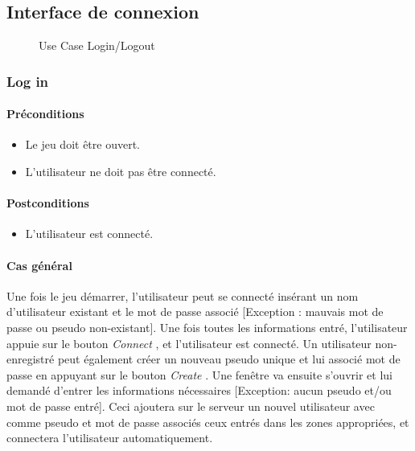 \documentclass[a4paper,11pt]{report}
\begin{document}
\subsection{Interface de connexion}
\begin{figure}[ht]
    \caption{Use Case Login/Logout}
\end{figure}
\subsubsection{Log in}
\paragraph{Préconditions}
\begin{itemize}
 \item Le jeu doit être ouvert.
 \item L'utilisateur ne doit pas être connecté.
\end{itemize}
\paragraph{Postconditions}
\begin{itemize}
 \item L'utilisateur est connecté.
\end{itemize}
\paragraph{Cas général}
Une fois le jeu démarrer, l'utilisateur peut se connecté insérant un nom d'utilisateur existant et le mot de passe associé
[Exception : mauvais mot de passe ou pseudo non-existant].
Une fois toutes les informations entré, l'utilisateur appuie sur le bouton \og \textit{Connect} \fg, et l'utilisateur est
connecté. Un utilisateur non-enregistré peut également créer un nouveau pseudo unique
et lui associé mot de passe en appuyant sur le bouton \og \textit{Create} .
Une fenêtre va ensuite s'ouvrir et lui demandé d'entrer les informations nécessaires 
[Exception: aucun pseudo et/ou mot de passe entré]. Ceci ajoutera sur le serveur un nouvel utilisateur avec comme
pseudo et mot de passe associés ceux entrés dans les zones appropriées, et connectera l'utilisateur automatiquement.
\end{document}
